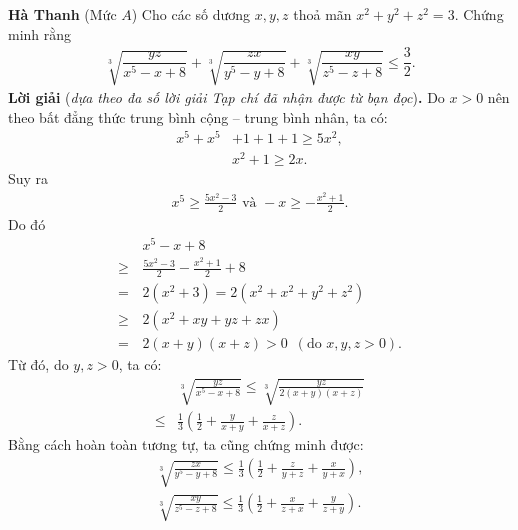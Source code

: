 \begin{multicols}{2}
	\vskip 0.1cm
	\hfill	\textbf{\color{thachthuctoanhoc}Hà Thanh}
	\vskip 0.1cm
	{}
	(Mức $A$) Cho các số dương $x,y,z$ thoả mãn $x^2+y^2+z^2=3$. Chứng minh rằng
	\begin{align*}
		\sqrt[3]{\dfrac{y z}{x^5\!-\!x\!+\!8}}\!+\!\sqrt[3]{\dfrac{z x}{y^5\!-\!y\!+\!8}}\!+\!\sqrt[3]{\dfrac{x y}{z^5\!-\!z\!+\!8}} \!\le\! \dfrac{3}{2}.
	\end{align*}
	\textbf{\color{thachthuctoanhoc}Lời giải} (\textit{dựa theo đa số lời giải Tạp chí đã nhận được từ bạn đọc})\textbf{\color{thachthuctoanhoc}.}
	\vskip 0.05cm
	Do $x > 0$ nên theo bất đẳng thức trung bình cộng -- trung bình nhân, ta có:
	\begin{align*}
		{x^5} + {x^5} &+ 1 + 1 + 1 \ge 5{x^2},\\[-0.5ex]
		&{x^2} + 1 \ge 2x.
	\end{align*}
	Suy ra
	\begin{align*}
		{x^5} \ge \frac{{5{x^2} - 3}}{2} \text{ và }  - x \ge  - \frac{{{x^2} + 1}}{2}.
	\end{align*}
	Do đó
	\begin{align*}
			&{x^5} - x + 8 \\[-0.5ex]
			\ge \,&\frac{{5{x^2} - 3}}{2} - \frac{{{x^2} + 1}}{2} + 8 \\[-0.5ex]
			= \,&2\left( {{x^2} + 3} \right) = 2\left( {{x^2} + {x^2} + {y^2} + {z^2}} \right)\\[-0.5ex]
			 \ge \,&2\left( {{x^2} + xy + yz + zx} \right) \\[-0.5ex]
			 = \,&2\left( {x + y} \right)\left( {x + z} \right) > 0\,\,\,\left( {{\text{do }}x,y,z > 0} \right).
	\end{align*}
	Từ đó, do $y, z > 0$, ta có:
	\begin{align*}
		&\sqrt[3]{{\frac{{yz}}{{{x^5} - x + 8}}}} \le \sqrt[3]{{\frac{{yz}}{{2\left( {x + y} \right)\left( {x + z} \right)}}}} \\
		\le &\frac{1}{3}\left( {\frac{1}{2} + \frac{y}{{x + y}} + \frac{z}{{x + z}}} \right). \tag{$1$}
	\end{align*}
	Bằng cách hoàn toàn tương tự, ta cũng chứng minh được:
	\begin{align*}
		\sqrt[3]{{\frac{{zx}}{{{y^5} \!-\! y \!+\! 8}}}} \!\le\! \frac{1}{3}\!\left( {\frac{1}{2} \!+\! \frac{z}{{y \!+\! z}} \!+\! \frac{x}{{y \!+\! x}}} \right)\!\!, \tag{$2$}\\
		\sqrt[3]{{\frac{{xy}}{{{z^5} \!-\! z \!+\! 8}}}} \!\le\! \frac{1}{3}\!\left( {\frac{1}{2} \!+\! \frac{x}{{z \!+\! x}} \!+\! \frac{y}{{z \!+\! y}}} \right)\!\!. \tag{$3$}

\end{align*}
\end{multicols}
